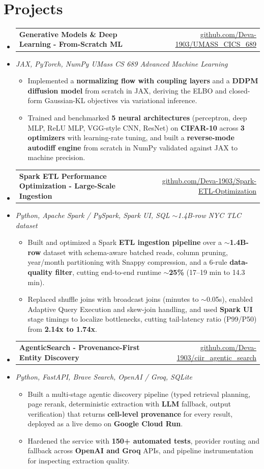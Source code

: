 \documentclass[letterpaper,10pt]{article}
\makeatletter
\newcommand{\resumeItem}[1]{
  \item\small{#1\vspace{-1pt}}
}
\newcommand{\resumeProjectHeading}[2]{
    \item
    \begin{tabular*}{0.985\textwidth}[t]{l@{\extracolsep{\fill}}r}
      \small\textbf{#1} & \small #2 \\
    \end{tabular*}\vspace{-5pt}
}
\newcommand{\resumeProjectSubheading}[1]{
  \vspace{-2pt}\item[] {\small\textcolor{ResumeSlate}{\emph{#1}}}\vspace{-3pt}
}
\newcommand{\resumeSubHeadingListStart}{\begin{itemize}[leftmargin=0.0in, label={}, itemsep=2pt, topsep=2pt]}
\newcommand{\resumeSubHeadingListEnd}{\end{itemize}}
\newcommand{\resumeItemListStart}{\begin{itemize}[leftmargin=0.18in, itemsep=2pt, topsep=1pt]}
\newcommand{\resumeItemListEnd}{\end{itemize}\vspace{-4pt}}
\makeatother
\begin{document}
\section{Projects}
\resumeSubHeadingListStart
  \resumeProjectHeading
    {Generative Models \& Deep Learning - From-Scratch ML}
    {\href{https://github.com/Deva-1903/UMASS_CICS_689}{github.com/Deva-1903/UMASS\_CICS\_689}}
  \resumeProjectSubheading{JAX, PyTorch, NumPy \enspace\textbar\enspace UMass CS 689 Advanced Machine Learning}
    \resumeItemListStart
      \resumeItem{Implemented a \textbf{normalizing flow with coupling layers} and a \textbf{DDPM diffusion model} from scratch in JAX, deriving the ELBO and closed-form Gaussian-KL objectives via variational inference.}
      \resumeItem{Trained and benchmarked \textbf{5 neural architectures} (perceptron, deep MLP, ReLU MLP, VGG-style CNN, ResNet) on \textbf{CIFAR-10} across \textbf{3 optimizers} with learning-rate tuning, and built a \textbf{reverse-mode autodiff engine} from scratch in NumPy validated against JAX to machine precision.}
    \resumeItemListEnd
  \resumeProjectHeading
    {Spark ETL Performance Optimization - Large-Scale Ingestion}
    {\href{https://github.com/Deva-1903/Spark-ETL-Optimization}{github.com/Deva-1903/Spark-ETL-Optimization}}
  \resumeProjectSubheading{Python, Apache Spark / PySpark, Spark UI, SQL \enspace\textbar\enspace \(\sim\)1.4B-row NYC TLC dataset}
    \resumeItemListStart
      \resumeItem{Built and optimized a Spark \textbf{ETL ingestion pipeline} over a \textbf{\(\sim\)1.4B-row} dataset with schema-aware batched reads, column pruning, year/month partitioning with Snappy compression, and a 6-rule \textbf{data-quality filter}, cutting end-to-end runtime \textbf{\(\sim\)25\%} (17--19 min to 14.3 min).}
      \resumeItem{Replaced shuffle joins with broadcast joins (minutes to \(\sim\)0.05s), enabled Adaptive Query Execution and skew-join handling, and used \textbf{Spark UI} stage timings to localize bottlenecks, cutting tail-latency ratio (P99/P50) from \textbf{2.14x to 1.74x}.}
    \resumeItemListEnd
  \resumeProjectHeading
    {AgenticSearch - Provenance-First Entity Discovery}
    {\href{https://github.com/Deva-1903/ciir_agentic_search}{github.com/Deva-1903/ciir\_agentic\_search}}
  \resumeProjectSubheading{Python, FastAPI, Brave Search, OpenAI / Groq, SQLite}
    \resumeItemListStart
      \resumeItem{Built a multi-stage agentic discovery pipeline (typed retrieval planning, page rerank, deterministic extraction with \textbf{LLM} fallback, output verification) that returns \textbf{cell-level provenance} for every result, deployed as a live demo on \textbf{Google Cloud Run}.}
      \resumeItem{Hardened the service with \textbf{150+ automated tests}, provider routing and fallback across \textbf{OpenAI and Groq} APIs, and pipeline instrumentation for inspecting extraction quality.}
    \resumeItemListEnd
\resumeSubHeadingListEnd
\vspace{-4pt}
\end{document}

